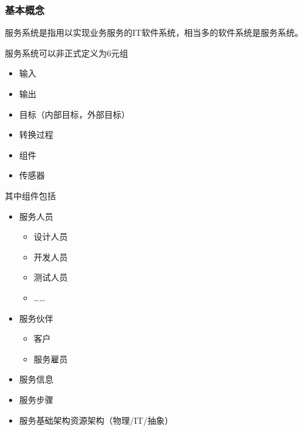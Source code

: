 \subsubsection{基本概念}
服务系统是指用以实现业务服务的IT软件系统，相当多的软件系统是服务系统。

服务系统可以非正式定义为6元组
\vspace{-0.8em}
\begin{multicols}{3}
    \begin{itemize}
        \item 输入
        \item 输出
        \item 目标（内部目标，外部目标）
        \item 转换过程
        \item 组件
        \item 传感器
    \end{itemize}
\end{multicols}
\vspace{-1em}

其中组件包括
\vspace{-0.8em}
\begin{spacing}{1.12}
\begin{multicols}{2}
    \begin{itemize}
        \item 服务人员
        \vspace{-0.8em}
        \begin{multicols}{2}
            \begin{itemize}
                \item 设计人员
                \item 开发人员
                \item 测试人员
                \item ……
            \end{itemize}
        \end{multicols}
        \vspace{-1.2em}
        \item 服务伙伴
        \vspace{-0.8em}
        \begin{multicols}{2}
            \begin{itemize}
                \item 客户
                \item 服务雇员
            \end{itemize}
        \end{multicols}
        \vspace{-1.2em}
        \item 服务信息
        \item 服务步骤
        \item 服务基础架构资源架构（物理/IT/抽象）
    \end{itemize}
\end{multicols}
\end{spacing}
\vspace{-1em}

